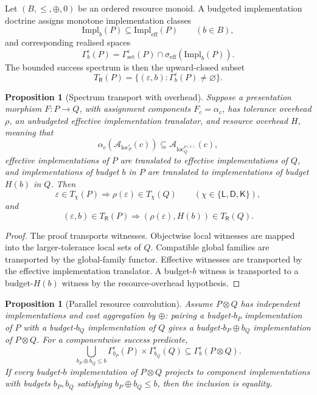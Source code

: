 \documentclass[11pt]{article}
\theoremstyle{plain}
\newtheorem{proposition}[theorem]{Proposition}
\theoremstyle{definition}
\theoremstyle{remark}
\newcommand{\LocalAdm}{\mathcal{A}_{\mathrm{loc}}}
\newcommand{\eps}{\varepsilon}
\begin{document}
Let $(B,\le,\oplus,0)$ be an ordered resource monoid. A budgeted implementation
doctrine assigns monotone implementation classes
\[
\mathrm{Impl}_b(P)\subseteq\mathrm{Impl}_{\mathrm{eff}}(P)
\qquad(b\in B),
\]
and corresponding realised spaces
\[
\Gamma_b^\eps(P)=\Gamma_{\mathrm{set}}^\eps(P)
\cap \sigma_{\mathrm{eff}}(\mathrm{Impl}_b(P)).
\]
The bounded success spectrum is then the upward-closed subset
\[
T_{\mathsf R}(P)=\{(\eps,b):\Gamma_b^\eps(P)\ne\varnothing\}.
\]

\begin{proposition}[Spectrum transport with overhead]
\label{prop:overhead-spectrum-transport}
Suppose a presentation morphism $F:P\to Q$, with assignment components
$F_c=\alpha_c$, has tolerance overhead $\rho$, an unbudgeted effective
implementation translator, and resource overhead $H$, meaning that
\[
\alpha_c(\LocalAdm_P^\eps(c))\subseteq \LocalAdm_Q^{\rho(\eps)}(c),
\]
effective implementations of $P$ are translated to effective implementations of
$Q$, and implementations of budget $b$ in $P$ are translated to implementations
of budget $H(b)$ in $Q$. Then
\[
\eps\in T_\chi(P)\Longrightarrow \rho(\eps)\in T_\chi(Q)
\qquad(\chi\in\{\mathsf L,\mathsf D,\mathsf K\}),
\]
and
\[
(\eps,b)\in T_{\mathsf R}(P)
\Longrightarrow
(\rho(\eps),H(b))\in T_{\mathsf R}(Q).
\]
\end{proposition}

\begin{proof}
The proof transports witnesses. Objectwise local witnesses are mapped into the
larger-tolerance local sets of $Q$. Compatible global families are transported by
the global-family functor. Effective witnesses are transported by the effective
implementation translator. A budget-$b$ witness is transported to a
budget-$H(b)$ witness by the resource-overhead hypothesis.
\end{proof}

\begin{proposition}[Parallel resource convolution]
\label{prop:parallel-resource-convolution}
Assume $P\otimes Q$ has independent implementations and cost aggregation by
$\oplus$: pairing a budget-$b_P$ implementation of $P$ with a budget-$b_Q$
implementation of $Q$ gives a budget-$b_P\oplus b_Q$ implementation of
$P\otimes Q$. For a componentwise success predicate,
\[
\bigcup_{b_P\oplus b_Q\le b}
\Gamma_{b_P}^\eps(P)\times\Gamma_{b_Q}^\eps(Q)
\subseteq
\Gamma_b^\eps(P\otimes Q).
\]
If every budget-$b$ implementation of $P\otimes Q$ projects to component
implementations with budgets $b_P,b_Q$ satisfying $b_P\oplus b_Q\le b$, then the
inclusion is equality.
\end{proposition}
\end{document}
